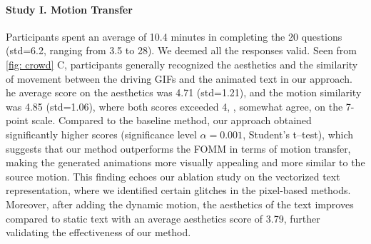 \paragraph{Study I. Motion Transfer}
Participants spent an average of 10.4 minutes in completing the 20 questions (std=6.2, ranging from 3.5 to 28).
We deemed all the responses valid.
Seen from \autoref{fig: crowd} C, participants generally recognized the aesthetics and the similarity of movement between the driving GIFs and the animated text in our approach.
he average score on the aesthetics was 4.71 (std=1.21), and the motion similarity was 4.85 (std=1.06), where both scores exceeded 4, \ie, somewhat agree, on the 7-point scale. 
Compared to the baseline method, our approach obtained significantly higher scores (significance level $\alpha=0.001$, Student's t--test), which suggests that our method outperforms the FOMM in terms of motion transfer, making the generated animations more visually appealing and more similar to the source motion.
This finding echoes our ablation study on the vectorized text representation, where we identified certain glitches in the pixel-based methods.
Moreover, after adding the dynamic motion, the aesthetics of the text improves compared to static text with an average aesthetics score of 3.79, further validating the effectiveness of our method.

